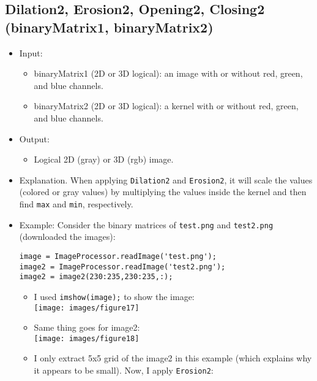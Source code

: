 \documentclass[11pt]{amsart}
\theoremstyle{remark}
\providecommand{\tightlist}{%
  \setlength{\itemsep}{0pt}\setlength{\parskip}{0pt}}
\theoremstyle{definition}
\theoremstyle{remark}
\numberwithin{equation}{section}
\begin{document}
\subsection{Dilation2, Erosion2, Opening2, Closing2 (binaryMatrix1,
binaryMatrix2)}\label{dilation2-erosion2-opening2-closing2-binarymatrix1-binarymatrix2}

\begin{itemize}
\item
  Input:

  \begin{itemize}
  \tightlist
  \item
    binaryMatrix1 (2D or 3D logical): an image with or without red,
    green, and blue channels.
  \item
    binaryMatrix2 (2D or 3D logical): a kernel with or without red,
    green, and blue channels.
  \end{itemize}
\item
  Output:

  \begin{itemize}
  \tightlist
  \item
    Logical 2D (gray) or 3D (rgb) image.
  \end{itemize}
\item
  Explanation. When applying \texttt{Dilation2} and \texttt{Erosion2},
  it will scale the values (colored or gray values) by multiplying the
  values inside the kernel and then find \texttt{max} and \texttt{min},
  respectively.
\item
  Example: Consider the binary matrices of \texttt{test.png} and
  \texttt{test2.png} (downloaded the images):

\begin{verbatim}
image = ImageProcessor.readImage('test.png');
image2 = ImageProcessor.readImage('test2.png');
image2 = image2(230:235,230:235,:);
\end{verbatim}

  \begin{itemize}
  \item
    I used \texttt{imshow(image);} to show the image:\\
    \texttt{[image: images/figure17]}\\
  \item
    Same thing goes for image2:\\
    \texttt{[image: images/figure18]}\\
  \item
    I only extract 5x5 grid of the image2 in this example (which
    explains why it appears to be small). Now, I apply
    \texttt{Erosion2}:


\end{itemize}
\end{itemize}
\end{document}
